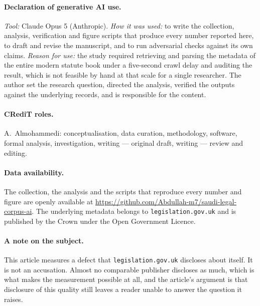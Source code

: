 \documentclass[11pt]{article}
\newif\ifanon
\begin{document}
\paragraph{Declaration of generative AI use.} \emph{Tool:} Claude Opus 5
(Anthropic). \emph{How it was used:} to write the collection, analysis,
verification and figure scripts that produce every number reported here, to
draft and revise the manuscript, and to run adversarial checks against its own
claims. \emph{Reason for use:} the study required retrieving and parsing the
metadata of the entire modern statute book under a five-second crawl delay and
auditing the result, which is not feasible by hand at that scale for a single
researcher. The author set the research question, directed the analysis,
verified the outputs against the underlying records, and is responsible for the
content.

\ifanon
\paragraph{Data availability.} The collection, the analysis and the scripts
that reproduce every number and figure are openly available in a public
repository under a permissive licence. Its address names the author, so it is
given on the title page rather than here. The underlying metadata belongs to
\texttt{legislation.gov.uk} and is published by the Crown under the Open
Government Licence.
\else
\paragraph{CRediT roles.} A.~Almohammedi: conceptualisation, data curation,
methodology, software, formal analysis, investigation, writing --- original
draft, writing --- review and editing.

\paragraph{Data availability.} The collection, the analysis and the scripts
that reproduce every number and figure are openly available at
\url{https://github.com/Abdullah-m7/saudi-legal-corpus-ai}. The underlying
metadata belongs to \texttt{legislation.gov.uk} and is published by the Crown
under the Open Government Licence.
\fi

\paragraph{A note on the subject.} This article measures a defect that
\texttt{legislation.gov.uk} discloses about itself. It is not an accusation.
Almost no comparable publisher discloses as much, which is what makes the
measurement possible at all, and the article's argument is that disclosure of
this quality still leaves a reader unable to answer the question it raises.
\end{document}
